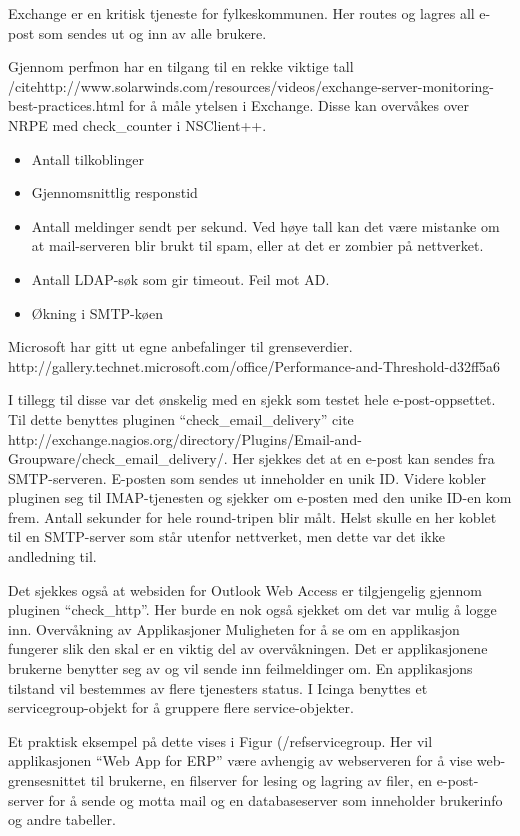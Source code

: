 Exchange er en kritisk tjeneste for fylkeskommunen. Her routes og lagres all e-post som sendes ut og inn av alle brukere. 

Gjennom perfmon har en tilgang til en rekke viktige tall /cite{http://www.solarwinds.com/resources/videos/exchange-server-monitoring-best-practices.html} for å måle ytelsen i Exchange. Disse kan overvåkes over NRPE med check\_counter i NSClient++.
\begin{itemize}
	\item Antall tilkoblinger
	\item Gjennomsnittlig responstid
	\item Antall meldinger sendt per sekund. Ved høye tall kan det være mistanke om at mail-serveren blir brukt til spam, eller at det er zombier på nettverket.
	\item Antall LDAP-søk som gir timeout. Feil mot AD.
	\item Økning i SMTP-køen
\end{itemize}

Microsoft har gitt ut egne anbefalinger til grenseverdier. http://gallery.technet.microsoft.com/office/Performance-and-Threshold-d32ff5a6

I tillegg til disse var det ønskelig med en sjekk som testet hele e-post-oppsettet. Til dette benyttes pluginen “check\_email\_delivery” cite http://exchange.nagios.org/directory/Plugins/Email-and-Groupware/check\_email\_delivery/. Her sjekkes det at en e-post kan sendes fra SMTP-serveren. E-posten som sendes ut inneholder en unik ID. Videre kobler pluginen seg til IMAP-tjenesten og sjekker om e-posten med den unike ID-en kom frem. Antall sekunder for hele round-tripen blir målt. Helst skulle en her koblet til en SMTP-server som står utenfor nettverket, men dette var det ikke andledning til.

Det sjekkes også at websiden for Outlook Web Access er tilgjengelig gjennom pluginen “check\_http”. Her burde en nok også sjekket om det var mulig å logge inn.
Overvåkning av Applikasjoner
Muligheten for å se om en applikasjon fungerer slik den skal er en viktig del av overvåkningen. Det er applikasjonene brukerne benytter seg av og vil sende inn feilmeldinger om. En applikasjons tilstand vil bestemmes av flere tjenesters status. I Icinga benyttes et servicegroup-objekt for å gruppere flere service-objekter.

Et praktisk eksempel på dette vises i Figur (/ref{servicegroup}. Her vil applikasjonen “Web App for ERP” være avhengig av webserveren for å vise web-grensesnittet til brukerne, en filserver for lesing og lagring av filer, en e-post-server for å sende og motta mail og en databaseserver som inneholder brukerinfo og andre tabeller. 


